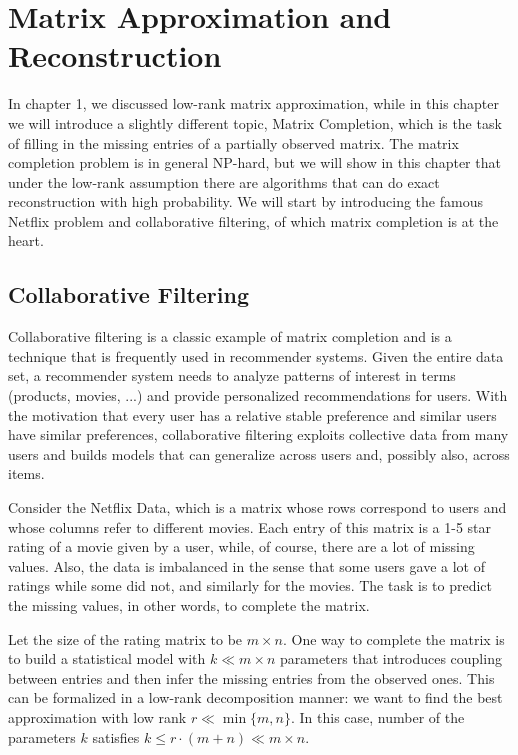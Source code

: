 \documentclass[../book-template.tex]{subfiles}
\begin{document}
\chapter{Matrix Approximation and Reconstruction}
In chapter 1, we discussed low-rank matrix approximation, while in this chapter we will introduce a slightly different topic, Matrix Completion, which is the task of filling in the missing entries of a partially observed matrix. The matrix completion problem is in general NP-hard, but we will show in this chapter that under the low-rank assumption there are algorithms that can do exact reconstruction with high probability. We will start by introducing the famous Netflix problem and collaborative filtering, of which matrix completion is at the heart.

\section{Collaborative Filtering}
Collaborative filtering is a classic example of matrix completion and is a technique that is frequently used in recommender systems. Given the entire data set, a recommender system needs to analyze patterns of interest in terms (products, movies, ...) and provide personalized recommendations for users. With the motivation that every user has a relative stable preference and similar users have similar preferences, collaborative filtering exploits collective data from many users and builds models that can generalize across users and, possibly also, across items.
\par Consider the Netflix Data, which is a matrix whose rows correspond to users and whose columns refer to different movies. Each entry of this matrix is a 1-5 star rating of a movie given by a user, while, of course, there are a lot of missing values. Also, the data is imbalanced in the sense that some users gave a lot of ratings while some did not, and similarly for the movies. The task is to predict the missing values, in other words, to complete the matrix.
\par Let the size of the rating matrix to be  $m\times n$. One way to complete the matrix is to build a statistical model with $k\ll m\times n$ parameters that introduces coupling between entries and then infer the missing entries from the observed ones. This can be formalized in a low-rank decomposition manner: we want to find the best approximation with low rank $r\ll \min\{m,n\}$. In this case, number of the parameters $k$
satisfies $k\leq r\cdot (m+n)\ll m\times n$.
\end{document}
